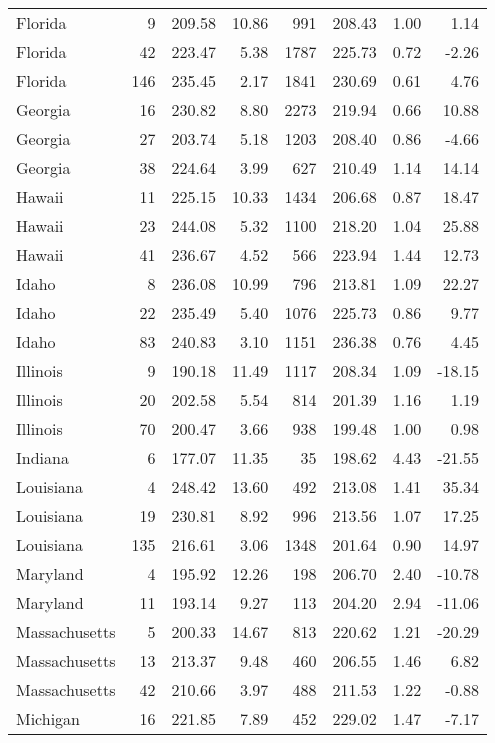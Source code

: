 \begin{longtable}{lrrr@{\extracolsep{10pt}}rrrr}
  Florida &   9 & 209.58 & 10.86 & 991 & 208.43 & 1.00 & 1.14 \\ 
  Florida &  42 & 223.47 & 5.38 & 1787 & 225.73 & 0.72 & -2.26 \\ 
  Florida & 146 & 235.45 & 2.17 & 1841 & 230.69 & 0.61 & 4.76 \\ 
  Georgia &  16 & 230.82 & 8.80 & 2273 & 219.94 & 0.66 & 10.88 \\ 
  Georgia &  27 & 203.74 & 5.18 & 1203 & 208.40 & 0.86 & -4.66 \\ 
  Georgia &  38 & 224.64 & 3.99 & 627 & 210.49 & 1.14 & 14.14 \\ 
  Hawaii &  11 & 225.15 & 10.33 & 1434 & 206.68 & 0.87 & 18.47 \\ 
  Hawaii &  23 & 244.08 & 5.32 & 1100 & 218.20 & 1.04 & 25.88 \\ 
  Hawaii &  41 & 236.67 & 4.52 & 566 & 223.94 & 1.44 & 12.73 \\ 
  Idaho &   8 & 236.08 & 10.99 & 796 & 213.81 & 1.09 & 22.27 \\ 
  Idaho &  22 & 235.49 & 5.40 & 1076 & 225.73 & 0.86 & 9.77 \\ 
  Idaho &  83 & 240.83 & 3.10 & 1151 & 236.38 & 0.76 & 4.45 \\ 
  Illinois &   9 & 190.18 & 11.49 & 1117 & 208.34 & 1.09 & -18.15 \\ 
  Illinois &  20 & 202.58 & 5.54 & 814 & 201.39 & 1.16 & 1.19 \\ 
  Illinois &  70 & 200.47 & 3.66 & 938 & 199.48 & 1.00 & 0.98 \\ 
  Indiana &   6 & 177.07 & 11.35 &  35 & 198.62 & 4.43 & -21.55 \\ 
  Louisiana &   4 & 248.42 & 13.60 & 492 & 213.08 & 1.41 & 35.34 \\ 
  Louisiana &  19 & 230.81 & 8.92 & 996 & 213.56 & 1.07 & 17.25 \\ 
  Louisiana & 135 & 216.61 & 3.06 & 1348 & 201.64 & 0.90 & 14.97 \\ 
  Maryland &   4 & 195.92 & 12.26 & 198 & 206.70 & 2.40 & -10.78 \\ 
  Maryland &  11 & 193.14 & 9.27 & 113 & 204.20 & 2.94 & -11.06 \\ 
  Massachusetts &   5 & 200.33 & 14.67 & 813 & 220.62 & 1.21 & -20.29 \\ 
  Massachusetts &  13 & 213.37 & 9.48 & 460 & 206.55 & 1.46 & 6.82 \\ 
  Massachusetts &  42 & 210.66 & 3.97 & 488 & 211.53 & 1.22 & -0.88 \\ 
  Michigan &  16 & 221.85 & 7.89 & 452 & 229.02 & 1.47 & -7.17 \\ 

\end{longtable}
